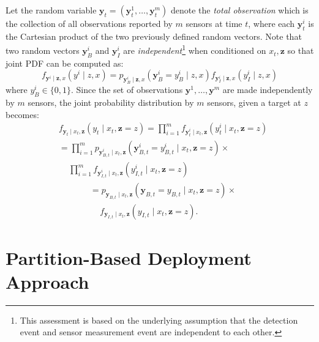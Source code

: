 \documentclass[letterpaper, 10 pt, conference]{ieeeconf}
\begin{document}
Let the random variable $\bm{y}_t=(\bm{y}_t^1,\dots,\bm{y}_t^m)$ denote the \emph{total observation} which is the collection of all observations reported by $m$ sensors at time $t$, where each $\bm{y}_t^i$ is the Cartesian product of the two previously defined random vectors.
Note that two random vectors $\bm{y}_B^i$ and $\bm{y}_I^i$ are \emph{independent}\footnote{This assessment is based on the underlying assumption that the detection event and sensor measurement event are independent to each other.} when conditioned on $x_t,\bm{z}$ so that joint PDF can be computed as:
\begin{equation}
f_{\bm{y}^i \mid \bm{z},x}(y^i \mid z,x) = p_{\bm{y}_B^i \mid \bm{z},x}(\bm{y}_B^i=y_B^i \mid z,x)f_{\bm{y}_I^i \mid \bm{z},x}(y_I^i \mid z,x)
\end{equation}
where $y_B^i \in \lbrace 0,1 \rbrace$.
Since the set of observations $\bm{y}^1,\dots,\bm{y}^m$ are made independently by $m$ sensors, the joint probability distribution by $m$ sensors, given a target at $z$ becomes:
\begin{align}
&f_{\bm{y}_t\mid x_t,\bm{z}}
\left(
y_t
 \mid x_t,\bm{z}=z
\right) 
= \prod_{i=1}^m
f_{\bm{y}_t^i\mid x_t,\bm{z}}
\left(
y_t^i \mid x_t,\bm{z}=z \right) \\
&= \prod_{i=1}^m p_{\bm{y}_{B,t}^i\mid x_t,\bm{z}}
\left(
\bm{y}_{B,t}^i=y_{B,t}^i\mid x_t,\bm{z}=z \right) 
\times \nonumber \\
&\,\,\,\,\,\,\,\prod_{i=1}^m 
f_{\bm{y}_{I,t}^i\mid x_t,\bm{z}}
\left(
y_{I,t}^i
\mid x_t,\bm{z}=z
\right) 
\end{align}
\begin{align}
&= p_{\bm{y}_{B,t}\mid x_t,\bm{z}}
\left(
\bm{y}_{B,t}=y_{B,t}
\mid x_t,\bm{z}=z
\right) \times \nonumber \\
&\,\,\,\,\,\,\,f_{\bm{y}_{I,t}\mid x_t,\bm{z}}
\left(
y_{I,t}
\mid x_t,\bm{z}=z
\right).
\end{align}




\section{Partition-Based Deployment Approach}
\label{sec:sec4}
\end{document}
